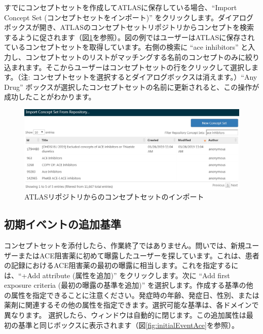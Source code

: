 \documentclass[
  11pt]{book}
\theoremstyle{definition}
\theoremstyle{definition}
\theoremstyle{definition}
\theoremstyle{definition}
\theoremstyle{remark}
\begin{document}
すでにコンセプトセットを作成してATLASに保存している場合、``Import Concept Set (コンセプトセットをインポート)'' をクリックします。ダイアログボックスが開き、ATLASのコンセプトセットリポジトリからコンセプトを検索するように促されます（図\ref{fig:ATLASfindyourconcept}を参照）。図の例ではユーザーはATLASに保存されているコンセプトセットを取得しています。右側の検索に ``ace inhibitors'' と入力し、コンセプトセットのリストがマッチングする名前のコンセプトのみに絞り込まれます。そこからユーザーはコンセプトセットの行をクリックして選択します。（注: コンセプトセットを選択するとダイアログボックスは消えます。）``Any Drug'' ボックスが選択したコンセプトセットの名前に更新されると、この操作が成功したことがわかります。

\begin{figure}

{\centering \includegraphics[width=1\linewidth]{images/Cohorts/ATLAS-findingyourconcept} 

}

\caption{ATLASリポジトリからのコンセプトセットのインポート}\label{fig:ATLASfindyourconcept}
\end{figure}

\subsection{初期イベントの追加基準}\label{ux521dux671fux30a4ux30d9ux30f3ux30c8ux306eux8ffdux52a0ux57faux6e96}

コンセプトセットを添付したら、作業終了ではありません。問いでは、新規ユーザーまたはACE阻害薬に初めて曝露したユーザーを探しています。これは、患者の記録におけるACE阻害薬の最初の曝露に相当します。これを指定するには、``+Add attribute (属性を追加)'' をクリックします。次に ``Add first exposure criteria (最初の曝露の基準を追加)'' を選択します。作成する基準の他の属性を指定できることに注意ください。発症時の年齢、発症日、性別、または薬剤に関連するその他の属性を指定できます。選択可能な基準は、各ドメインで異なります。 選択したら、ウィンドウは自動的に閉じます。この追加属性は最初の基準と同じボックスに表示されます（図\ref{fig:initialEventAce}を参照）。
\end{document}
